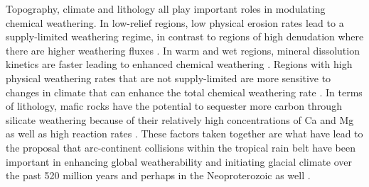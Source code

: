 \documentclass[11pt,letterpaper]{article}
\newcommand{\pCOtwo}{\textit{p}CO$_{2}$\xspace}
\newcommand{\COtwo}{CO$_{2}$\xspace}
\begin{document}

Topography, climate and lithology all play important roles in modulating chemical weathering. In low-relief regions, low physical erosion rates lead to a supply-limited weathering regime, in contrast to regions of high denudation where there are higher weathering fluxes \citep{Gabet2009a, West2012a, Maher2014a}. In warm and wet regions, mineral dissolution kinetics are faster leading to enhanced chemical weathering \citep{Lasaga1994a, West2012a}. Regions with high physical weathering rates that are not supply-limited are more sensitive to changes in climate that can enhance the total chemical weathering rate \citep{West2012a, Maher2014a}. In terms of lithology, mafic rocks have the potential to sequester more carbon through silicate weathering because of their relatively high concentrations of Ca and Mg as well as high reaction rates \citep{Dessert2003a}. These factors taken together are what have lead to the proposal that arc-continent collisions within the tropical rain belt have been important in enhancing global weatherability and initiating glacial climate over the past 520 million years \citep{Jagoutz2016a,Swanson-Hysell2017a,Macdonald2019a} and perhaps in the Neoproterozoic as well \citep{Park2019a}.
\end{document}
